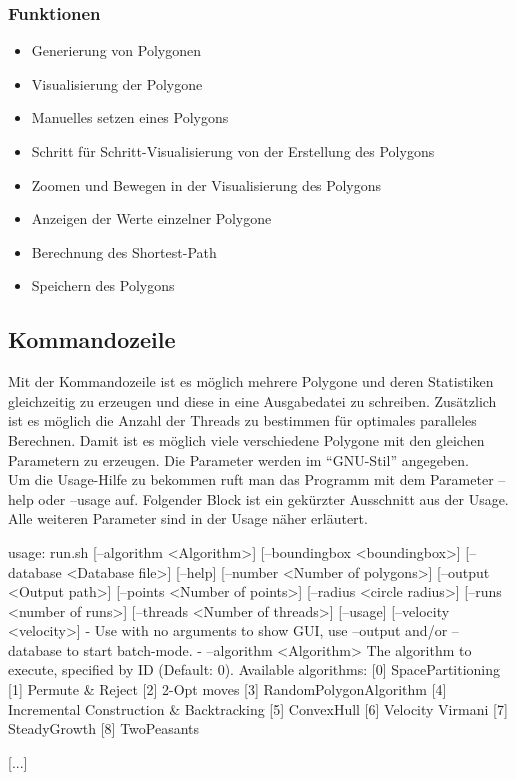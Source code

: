 \subsubsection{Funktionen}
\begin{itemize}
	\item Generierung von Polygonen
	\item Visualisierung der Polygone
	\item Manuelles setzen eines Polygons
	\item Schritt für Schritt-Visualisierung von der Erstellung des Polygons
	\item Zoomen und Bewegen in der Visualisierung des Polygons
	\item Anzeigen der Werte einzelner Polygone
	\item Berechnung des Shortest-Path
	\item Speichern des Polygons
\end{itemize}

\subsection{Kommandozeile}
Mit der Kommandozeile ist es möglich mehrere Polygone und deren Statistiken gleichzeitig zu erzeugen und diese in eine Ausgabedatei zu schreiben. Zusätzlich ist es möglich die Anzahl der Threads zu bestimmen für optimales paralleles Berechnen. Damit ist es möglich viele verschiedene Polygone mit den gleichen Parametern zu erzeugen. Die Parameter werden im \enquote{GNU-Stil} angegeben.\\
Um die Usage-Hilfe zu bekommen ruft man das Programm mit dem Parameter --help oder --usage auf. Folgender Block ist ein gekürzter Ausschnitt aus der Usage. Alle weiteren Parameter sind in der Usage näher erläutert.

\begin{code}
usage: run.sh [--algorithm <Algorithm>] [--boundingbox <boundingbox>]
       [--database <Database file>] [--help] [--number <Number of
       polygons>] [--output <Output path>] [--points <Number of points>]
       [--radius <circle radius>] [--runs <number of runs>] [--threads
       <Number of threads>] [--usage] [--velocity <velocity>]
-
Use with no arguments to show GUI, use --output and/or --database to start
batch-mode.
-
    --algorithm <Algorithm>         The algorithm to execute, specified by
                                    ID (Default: 0). Available algorithms:
                                    [0] SpacePartitioning
                                    [1] Permute & Reject
                                    [2] 2-Opt moves
                                    [3] RandomPolygonAlgorithm
                                    [4] Incremental Construction &
                                    Backtracking
                                    [5] ConvexHull
                                    [6] Velocity Virmani
                                    [7] SteadyGrowth
                                    [8] TwoPeasants

[...]
\end{code}

